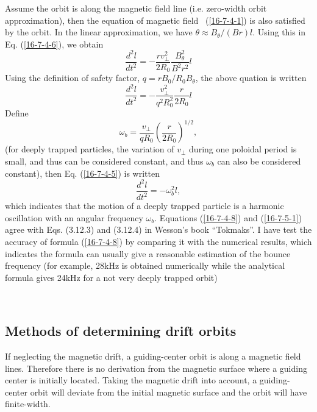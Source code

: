 \documentclass{article}
\begin{document}
Assume the orbit is along the magnetic field line (i.e. zero-width orbit
approximation), then the equation of magnetic field \ (\ref{16-7-4-1}) is also
satisfied by the orbit. In the linear approximation, we have $\theta \approx
B_{\theta} / (B r) l$. Using this in Eq. (\ref{16-7-4-6}), we obtain
\begin{equation}
  \frac{d^2 l}{d t^2} = - \frac{r v_{\perp}^2}{2 R_0}  \frac{B_{\theta}^2}{B^2
  r^2} l
\end{equation}
Using the definition of safety factor, $q = r B_0 / R_0 B_{\theta}$, the above
quation is written
\begin{equation}
  \label{16-7-4-5} \frac{d^2 l}{d t^2} = - \frac{v_{\perp}^2}{q^2 R_0^2} 
  \frac{r}{2 R_0} l
\end{equation}
Define
\begin{equation}
  \label{16-7-4-8} \omega_b = \frac{v_{\perp}}{q R_0}  \left( \frac{r}{2 R_0}
  \right)^{1 / 2},
\end{equation}
(for deeply trapped particles, the variation of $v_{\perp}$ during one
poloidal period is small, and thus can be considered constant, and thus
$\omega_b$ can also be considered constant), then Eq. (\ref{16-7-4-5}) is
written
\begin{equation}
  \label{16-7-5-1} \frac{d^2 l}{d t^2} = - \omega_b^2 l,
\end{equation}
which indicates that the motion of a deeply trapped particle is a harmonic
oscillation with an angular frequency $\omega_b$. Equations (\ref{16-7-4-8})
and (\ref{16-7-5-1}) agree with Eqs. (3.12.3) and (3.12.4) in Wesson's book
``Tokmaks''{\cite{wesson2004}}. I have test the accuracy of formula
(\ref{16-7-4-8}) by comparing it with the numerical results, which indicates
the formula can usually give a reasonable estimation of the bounce frequency
(for example, 28kHz is obtained numerically while the analytical formula gives
24kHz for a not very deeply trapped orbit)

\

\subsection{Methods of determining drift orbits}

If neglecting the magnetic drift, a guiding-center orbit is along a magnetic
field lines. Therefore there is no derivation from the magnetic surface where
a guiding center is initially located. Taking the magnetic drift into account,
a guiding-center orbit will deviate from the initial magnetic surface and the
orbit will have finite-width.
\end{document}
